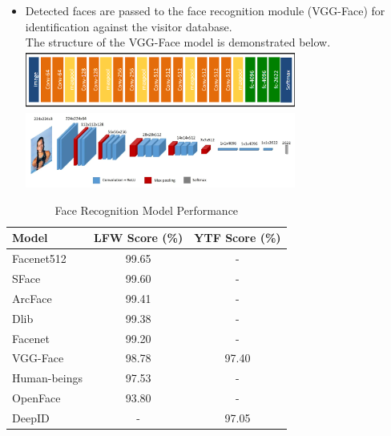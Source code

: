 \documentclass[a4 paper, 12pt]{article}
\begin{document}
\begin{enumerate}
\begin{itemize}
\begin{itemize}
                    \item Detected faces are passed to the face recognition module (VGG-Face) for identification against the visitor database.   
                    \\ The structure of the VGG-Face model is demonstrated below. 
                    \\ \includegraphics[width=0.7\textwidth]{vgg-face-model.png}
                    \\ \includegraphics[width=0.7\textwidth]{vgg-face-architecture.png}
                    
                \end{itemize}

            \begin{table}[ht]
    \centering
    \caption{Face Recognition Model Performance}
    \label{tab:face_recognition}
    \begin{tabular}{lcc}
        \toprule
        \textbf{Model} & \textbf{LFW Score (\%)} & \textbf{YTF Score (\%)} \\
        \midrule
        Facenet512 & 99.65 & - \\
        SFace & 99.60 & - \\
        ArcFace & 99.41 & - \\
        Dlib & 99.38 & - \\
        Facenet & 99.20 & - \\
        VGG-Face & 98.78 & 97.40 \\
        Human-beings & 97.53 & - \\
        OpenFace & 93.80 & - \\
        DeepID & - & 97.05 \\
        \bottomrule
    \end{tabular}
\end{table}
            
                \end{itemize}
            

\end{enumerate}
\end{document}
